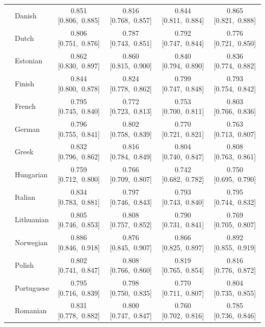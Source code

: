 \begin{longtable}[t]{llcccc}
 & Danish & 0.851 [0.806,~0.885] & 0.816 [0.768,~0.857] & 0.844 [0.811,~0.884] & 0.865 [0.821,~0.888]\\

 & Dutch & 0.806 [0.751,~0.876] & 0.787 [0.743,~0.851] & 0.792 [0.747,~0.844] & 0.776 [0.721,~0.850]\\

 & Estonian & 0.862 [0.830,~0.897] & 0.860 [0.815,~0.900] & 0.840 [0.794,~0.890] & 0.836 [0.774,~0.882]\\

 & Finish & 0.844 [0.800,~0.878] & 0.824 [0.778,~0.862] & 0.799 [0.747,~0.848] & 0.793 [0.754,~0.842]\\

 & French & 0.795 [0.745,~0.840] & 0.772 [0.723,~0.813] & 0.753 [0.700,~0.811] & 0.803 [0.766,~0.836]\\

 & German & 0.796 [0.755,~0.841] & 0.802 [0.758,~0.839] & 0.770 [0.721,~0.821] & 0.763 [0.713,~0.807]\\

 & Greek & 0.832 [0.796,~0.862] & 0.816 [0.784,~0.849] & 0.804 [0.740,~0.847] & 0.808 [0.763,~0.861]\\

 & Hungarian & 0.759 [0.712,~0.800] & 0.766 [0.709,~0.807] & 0.742 [0.682,~0.782] & 0.750 [0.695,~0.790]\\

 & Italian & 0.834 [0.783,~0.881] & 0.797 [0.746,~0.843] & 0.793 [0.743,~0.840] & 0.795 [0.744,~0.832]\\

 & Lithuanian & 0.805 [0.746,~0.853] & 0.808 [0.757,~0.852] & 0.790 [0.731,~0.841] & 0.769 [0.705,~0.807]\\

 & Norwegian & 0.886 [0.846,~0.918] & 0.876 [0.845,~0.907] & 0.866 [0.825,~0.897] & 0.892 [0.855,~0.919]\\

 & Polish & 0.802 [0.741,~0.847] & 0.808 [0.766,~0.860] & 0.819 [0.765,~0.854] & 0.816 [0.776,~0.872]\\

 & Portuguese & 0.795 [0.716,~0.839] & 0.798 [0.750,~0.835] & 0.770 [0.711,~0.807] & 0.804 [0.735,~0.855]\\

 & Romanian & 0.831 [0.778,~0.882] & 0.800 [0.747,~0.847] & 0.760 [0.702,~0.816] & 0.785 [0.736,~0.846]\\


\end{longtable}
